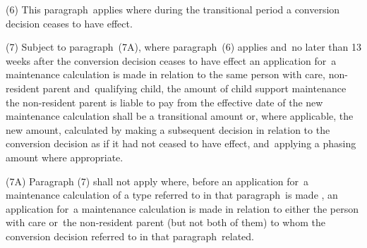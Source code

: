\documentclass[12pt,a4paper]{article}
\begin{document}
(6) This paragraph~applies where during the transitional period a 
conversion decision  %
ceases to have effect.

(7) 
Subject to paragraph~(7A), where  %
paragraph~(6) applies and~no later than 13 weeks after the 
conversion decision  %
ceases to have effect 
an application for~a maintenance calculation  %
is made
in relation to the same person with care, non-resident parent and~qualifying child, the amount of child support maintenance the non-resident parent is liable to pay from the effective date of the new maintenance calculation shall be a transitional amount or, where applicable, the new amount, calculated by making a subsequent decision in relation to the 
conversion decision  %
as if it had not ceased to have effect, and~applying a phasing amount where appropriate.

(7A) Paragraph (7) shall not apply where, before an application for~a maintenance calculation of a type referred to in that paragraph~is made%
, an application for~a maintenance calculation is made 
in relation to either the person with care or~the non-resident parent (but not both of them) to whom the 
conversion decision  %
referred to in that paragraph~related.
\end{document}
